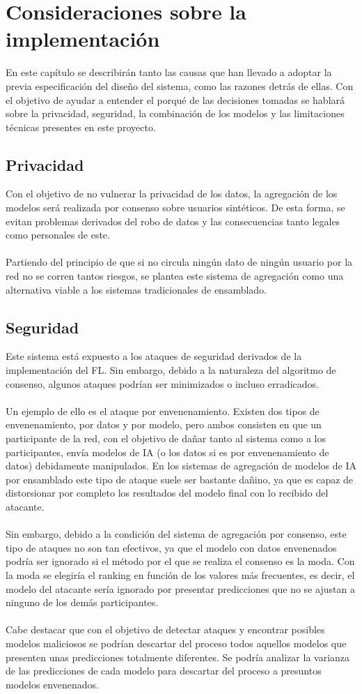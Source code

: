 \section{Consideraciones sobre la implementación}
En este capítulo se describirán tanto las causas que han llevado a adoptar la previa especificación del diseño del sistema, como las razones detrás de ellas. Con el objetivo de ayudar a entender el porqué de las decisiones tomadas se hablará sobre la privacidad, seguridad, la combinación de los modelos y las limitaciones técnicas presentes en este proyecto.
\subsection{Privacidad}
Con el objetivo de no vulnerar la privacidad de los datos, la agregación de los modelos será realizada por consenso sobre usuarios sintéticos. De esta forma, se evitan problemas derivados del robo de datos y las consecuencias tanto legales como personales de este.
\\ \\
Partiendo del principio de que si no circula ningún dato de ningún usuario por la red no se corren tantos riesgos, se plantea este sistema de agregación como una alternativa viable a los sistemas tradicionales de ensamblado.

\subsection{Seguridad}
Este sistema está expuesto a los ataques de seguridad derivados de la implementación del FL. Sin embargo, debido a la naturaleza del algoritmo de consenso, algunos ataques podrían ser minimizados o incluso erradicados.
\\ \\
Un ejemplo de ello es el ataque por envenenamiento. Existen dos tipos de envenenamiento, por datos y por modelo, pero ambos consisten en que un participante de la red, con el objetivo de dañar tanto al sistema como a los participantes, envía modelos de IA (o los datos si es por envenenamiento de datos) debidamente manipulados. En los sistemas de agregación de modelos de IA por ensamblado este tipo de ataque suele ser bastante dañino, ya que es capaz de distorsionar por completo los resultados del modelo final con lo recibido del atacante.
\\ \\
Sin embargo, debido a la condición del sistema de agregación por consenso, este tipo de ataques no son tan efectivos, ya que el modelo con datos envenenados podría ser ignorado si el método por el que se realiza el consenso es la moda. Con la moda se elegiría el ranking en función de los valores más frecuentes, es decir, el modelo del atacante sería ignorado por presentar predicciones que no se ajustan a ninguno de los demás participantes.
\\ \\
Cabe destacar que con el objetivo de detectar ataques y encontrar posibles modelos maliciosos se podrían descartar del proceso todos aquellos modelos que presenten unas predicciones totalmente diferentes. Se podría analizar la varianza de las predicciones de cada modelo para descartar del proceso a presuntos modelos envenenados.

